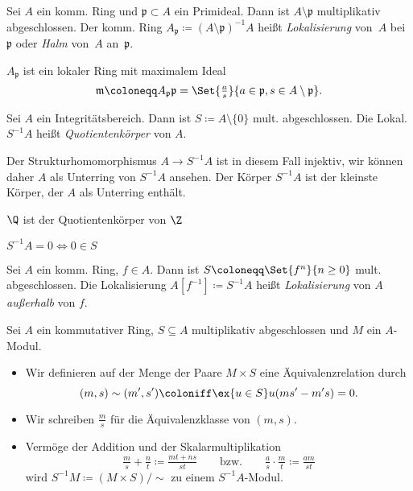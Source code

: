 \documentclass{cheat-sheet}
\newcommand{\ppp}{\mathfrak{p}}
\newcommand{\mmm}{\mathfrak{m}}
\begin{document}
\begin{defn}
  Sei $A$ ein komm. Ring und $\ppp \subset A$ ein Primideal.
  Dann ist $A \setminus \ppp$ multiplikativ abgeschlossen.
  Der komm. Ring $A_\ppp \coloneqq (A \setminus \ppp)^{-1} A$ heißt \emph{Lokalisierung} von~$A$ bei~$\ppp$ oder \emph{Halm} von~$A$ an~$\ppp$.
\end{defn}

\begin{bem}
  $A_\ppp$ ist ein lokaler Ring mit maximalem Ideal
  \[
    \mmm \coloneqq A_\ppp \ppp = \Set{\tfrac{a}{s}}{a \in \ppp, s \in A \setminus \ppp}.
  \]
\end{bem}

\begin{defn}
  Sei $A$ ein Integritätsbereich.
  Dann ist $S \coloneqq A \setminus \{ 0 \}$ mult. abgeschlossen.
  Die Lokal. $S^{-1} A$ heißt \emph{Quotientenkörper} von $A$.
\end{defn}

\begin{bem}
  Der Strukturhomomorphismus $A \to S^{-1} A$ ist in diesem Fall injektiv, wir können daher $A$ als Unterring von $S^{-1} A$ ansehen.
  Der Körper $S^{-1} A$ ist der kleinste Körper, der $A$ als Unterring enthält.
\end{bem}

\begin{bsp}
  $\Q$ ist der Quotientenkörper von $\Z$
\end{bsp}

\begin{bsp}
  $S^{-1} A = 0 \iff 0 \in S$
\end{bsp}

\begin{defn}
  Sei $A$ ein komm. Ring, $f \in A$.
  Dann ist $S \coloneqq \Set{f^n}{n \geq 0}$ mult. abgeschlossen.
  Die Lokalisierung $A[f^{-1}] \coloneqq S^{-1} A$ heißt \emph{Lokalisierung} von $A$ \emph{außerhalb} von $f$.
\end{defn}


\begin{konstr}
  Sei $A$ ein kommutativer Ring, $S \subseteq A$ multiplikativ abgeschlossen und $M$ ein $A$-Modul.
  \begin{itemize}
    \item Wir definieren auf der Menge der Paare $M \times S$ eine Äquivalenzrelation durch
    \[
      (m, s) \sim (m', s') \coloniff \ex{u \in S} u (m s' - m' s) = 0.
    \]
    \item Wir schreiben $\tfrac{m}{s}$ für die Äquivalenzklasse von $(m, s)$.
    \item Vermöge der Addition und der Skalarmultiplikation
    \[
      \tfrac{m}{s} + \tfrac{n}{t} \coloneqq \tfrac{m t + n s}{s t}
      \qquad \text{bzw.} \qquad
      \tfrac{a}{s} \cdot \tfrac{m}{t} \coloneqq \tfrac{a m}{s t}
    \]
    wird $S^{-1} M \coloneqq (M \times S)/{\sim}$ zu einem $S^{-1} A$-Modul.
  \end{itemize}
\end{konstr}
\end{document}
